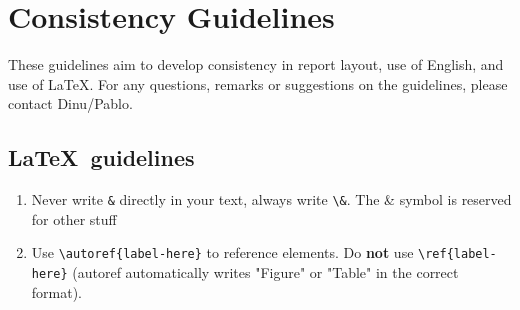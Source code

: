 \chapter*{Consistency Guidelines}
\label{chapter:template-guidelines}
These guidelines aim to develop consistency in report layout, use of English, and use of \LaTeX. For any questions, remarks or suggestions on the guidelines, please contact Dinu/Pablo.

\section*{\LaTeX \ guidelines}
\begin{enumerate}[label=LTX.\arabic*]
    \item Never write \verb|&| directly in your text, always write \verb|\&|. The \& symbol is reserved for other stuff
    \item Use \verb|\autoref{label-here}| to reference elements. Do \textbf{not} use \verb|\ref{label-here}| (autoref automatically writes "Figure" or "Table" in the correct format).
\end{enumerate}
